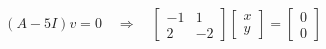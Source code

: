 \documentclass{article}
\begin{document}
\begin{align*}
(A - 5I)v = 0 \quad \Rightarrow \quad\begin{bmatrix} -1 & 1 \\ 2 & -2 \end{bmatrix}\begin{bmatrix} x \\ y \end{bmatrix}= \begin{bmatrix} 0 \\ 0 \end{bmatrix}
\end{align*}
\end{document}
